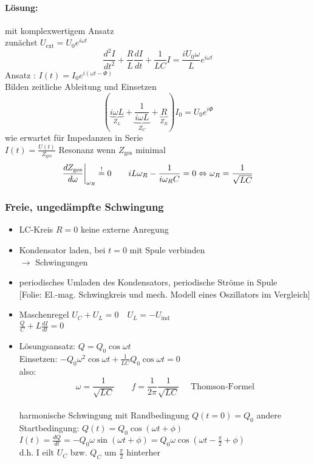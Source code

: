 \documentclass[titlepage,12pt,a4paper,ngerman]{report}
\newcommand{\tx}[1]{\textrm{#1}}
\newcommand{\ub}[1]{\underbrace{#1}}
\newcommand{\uind}{U_{\tx{ind}}}
\newcommand{\folie}[1]{\color{gray}[Folie: #1]\color{black}}
\begin{document}
\paragraph{Lösung:} mit komplexwertigem Ansatz\\
zunächst $ U_{\tx{ext}} = U_0 e^{i\omega t} $
$$ \frac{d^2 I}{dt^2} + \frac{R}{L} \frac{dI}{dt} + \frac{1}{LC} I = \frac{i U_0 \omega}{L} e ^{i \omega t}$$
Ansatz : $ I(t) = I_0 e ^{i(\omega t - \Phi)} $\\
Bilden zeitliche Ableitung und Einsetzen
$$ (\ub{i \omega L}_{Z_L} + \ub{\frac{1}{i \omega L}}_{Z_C} + \ub{R}_{Z_R} ) I_0 = U_0 e ^{i \Phi} $$
 wie erwartet für Impedanzen in Serie\\
 $ I(t) = \frac{U(t)}{Z_{\tx{ges}}} $ Resonanz wenn $ Z_{\tx{ges}} $ minimal
 $$\frac{d Z_{\tx{ges}}}{d \omega} \bigg|_{\omega_R} \buildrel ! \over = 0 \qquad i L \omega_R - \frac{1}{i \omega_R C} = 0 \Leftrightarrow \omega_R = \frac{1}{\sqrt{LC}}$$
 
 
 \subsubsection{Freie, ungedämpfte Schwingung}
 \begin{itemize}
 	\item LC-Kreis $ R = 0 $ keine externe Anregung
 	\item Kondensator laden, bei $ t=0 $ mit Spule verbinden\\
 	$ \rightarrow $ Schwingungen
 	\item periodisches Umladen des Kondensators, periodische Ströme in Spule\\
 	\folie{El.-mag. Schwingkreis und mech. Modell eines Oszillators im Vergleich}
 	\item Maschenregel $ U_C+U_L = 0 \quad U_L = -\uind $\\
 	$ \frac{Q}{C} + L \frac{dI}{dt} = 0 $
 	\item Lösungsansatz: $ Q = Q_0 \cos \omega t $\\
 	Einsetzen: $ -Q_0 \omega^2 \cos \omega t + \frac{1}{LC} Q_0 \cos \omega t = 0 $\\
 	also: $$\boxed{\omega = \frac{1}{\sqrt{LC}} \qquad f = \frac{1}{2 \pi} \frac{1}{\sqrt{LC}} } \quad \tx{ Thomson-Formel}$$\\
 	harmonische Schwingung mit Randbedingung $ Q(t=0)= Q_0 $ andere Startbedingung: $ Q(t) = Q_0 \cos(\omega t + \phi) $\\
 	$ I(t) = \frac{dQ}{dt} = - Q_0 \omega \sin(\omega t + \phi) = Q_0 \omega \cos (\omega t - \frac{\pi}{2} + \phi) $\\
 	d.h. I eilt $ U_C $ bzw. $ Q_C $ um $\frac{\pi}{2}$ hinterher
 \end{itemize}
\end{document}
